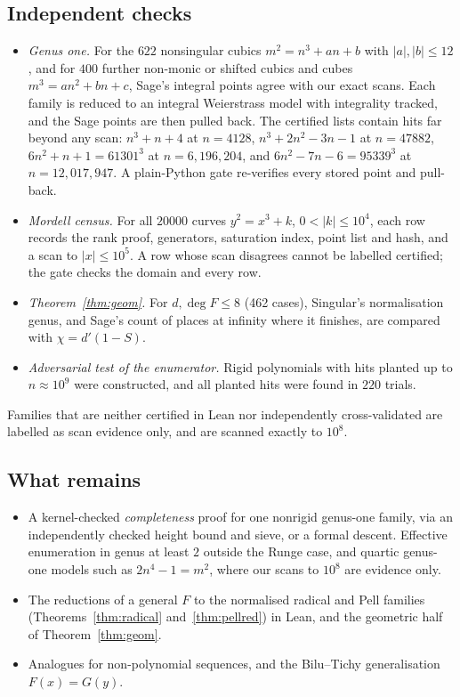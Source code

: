 \documentclass[11pt]{amsart}
\theoremstyle{definition}
\theoremstyle{remark}
\begin{document}
\subsection*{Independent checks}
\begin{itemize}
\item \emph{Genus one.} For the $622$ nonsingular cubics $m^2=n^3+an+b$ with $|a|,|b|\le12$, and for $400$ further non-monic or shifted cubics and cubes $m^3=an^2+bn+c$, Sage's integral points agree with our exact scans. Each family is reduced to an integral Weierstrass model with integrality tracked, and the Sage points are then pulled back. The certified lists contain hits far beyond any scan: $n^3+n+4$ at $n=4128$, $n^3+2n^2-3n-1$ at $n=47882$, $6n^2+n+1=61301^3$ at $n=6{,}196{,}204$, and $6n^2-7n-6=95339^3$ at $n=12{,}017{,}947$. A plain-Python gate re-verifies every stored point and pull-back.
\item \emph{Mordell census.} For all $20000$ curves $y^2=x^3+k$, $0<|k|\le10^4$, each row records the rank proof, generators, saturation index, point list and hash, and a scan to $|x|\le10^5$. A row whose scan disagrees cannot be labelled certified; the gate checks the domain and every row.
\item \emph{Theorem~\ref{thm:geom}.} For $d,\deg F\le8$ (462 cases), Singular's normalisation genus, and Sage's count of places at infinity where it finishes, are compared with $\chi=d'(1-S)$.
\item \emph{Adversarial test of the enumerator.} Rigid polynomials with hits planted up to $n\approx10^9$ were constructed, and all planted hits were found in $220$ trials.
\end{itemize}
Families that are neither certified in Lean nor independently cross-validated are labelled as scan evidence only, and are scanned exactly to $10^8$.

\subsection*{What remains}
\begin{itemize}
\item A kernel-checked \emph{completeness} proof for one nonrigid genus-one family, via an independently checked height bound and sieve, or a formal descent. Effective enumeration in genus at least $2$ outside the Runge case, and quartic genus-one models such as $2n^4-1=m^2$, where our scans to $10^8$ are evidence only.
\item The reductions of a general $F$ to the normalised radical and Pell families (Theorems~\ref{thm:radical} and~\ref{thm:pellred}) in Lean, and the geometric half of Theorem~\ref{thm:geom}.
\item Analogues for non-polynomial sequences, and the Bilu--Tichy generalisation $F(x)=G(y)$.
\end{itemize}
\end{document}
